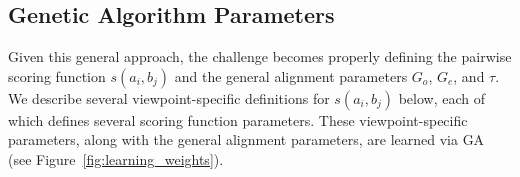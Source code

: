 \documentclass[phd,electronic,oneside,twosidetoc,letterpaper,chaptercenter,parttop,lof,lot]{byumsphd}
\begin{document}
\subsection{Genetic Algorithm Parameters}

Given this general approach, the challenge becomes properly defining the pairwise scoring function $s(a_i,b_j)$ and the general alignment parameters $G_o$, $G_e$, and $\tau$. We describe several viewpoint-specific definitions for $s(a_i, b_j)$ below, each of which defines several scoring function parameters. These viewpoint-specific parameters, along with the general alignment parameters, are learned via GA (see Figure~\ref{fig:learning_weights}).

\begin{figure}
\centering
\newcommand{\colwidth}{1.04in}
\setlength\tabcolsep{2pt} %
\newcolumntype{D}{ >{\centering\arraybackslash} m{\colwidth} }
\begin{tabular}{DDDDDDD}

\end{tabular}
\end{figure}
\end{document}
